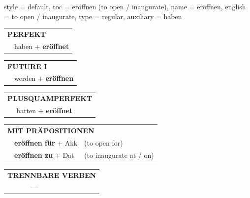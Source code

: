 \begin{verbentry}{
  style = {default},
  toc = {eröffnen (to open / inaugurate)},
  name = {eröffnen},
  english = {to open / inaugurate},
  type = {regular},
  auxiliary = {haben}
}
\vspace{10pt}

\begin{tabular}{rl}
\multicolumn{2}{l}{\textbf{PERFEKT}}\\
& haben + \textbf{eröffnet}\\
\end{tabular}
\hfill
\begin{tabular}{rl}
\multicolumn{2}{l}{\textbf{FUTURE I}}\\
& werden + \textbf{eröffnen}\\
\end{tabular}
\hfill
\begin{tabular}{rl}
\multicolumn{2}{l}{\textbf{PLUSQUAMPERFEKT}}\\
& hatten + \textbf{eröffnet}\\
\end{tabular}

\vspace{10pt}

\begin{tabular}{lll}
\multicolumn{3}{l}{\textbf{MIT PRÄPOSITIONEN}}\\
& \textbf{eröffnen für} + Akk & (to open for)\\
& \textbf{eröffnen zu} + Dat & (to inaugurate at / on)\\
\end{tabular}
\hfill
\begin{tabular}{lll}
\multicolumn{3}{l}{\textbf{TRENNBARE VERBEN}}\\
& \textbf{---} & \\
\end{tabular}
\vspace{-5pt}
\end{verbentry}

